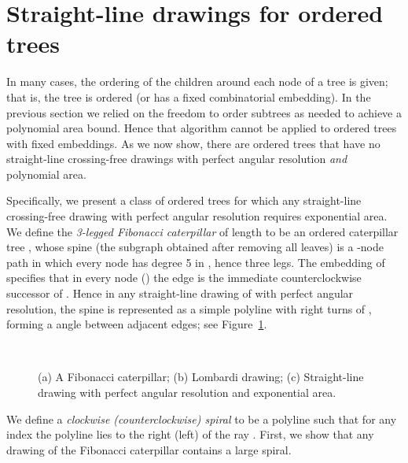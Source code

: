 \documentclass[11pt]{article}
\begin{document}
\section{Straight-line drawings for ordered trees}
\label{sec:exponentialArea}

In many cases, the ordering of the children around each node of a
tree is given; that is, the tree is ordered (or has a fixed
combinatorial embedding).  In the previous section we relied on the
freedom to order subtrees as needed to achieve a polynomial area
bound. Hence that algorithm cannot be applied to ordered trees with
fixed embeddings. As we now show, there are ordered trees that have no
straight-line crossing-free drawings with perfect
angular resolution  \emph{and} polynomial area.

Specifically, we present a class of ordered trees for which any
straight-line crossing-free drawing with perfect angular
resolution requires exponential area. 
We define the \emph{3-legged Fibonacci caterpillar} of length  to be an ordered caterpillar tree , whose spine (the subgraph obtained after removing all leaves) is a -node path  in which every node  has degree 5 in , hence three legs.
The embedding of  specifies that in every node  () the edge  is the immediate counterclockwise successor of .
Hence in any straight-line drawing of  with perfect angular resolution, the spine is represented as a simple polyline with  right turns of , forming a  angle between adjacent edges; see Figure~\ref{fig:fibWoolyWorm}.

\begin{figure}[hbt]
\centering
\begin{minipage}[b]{4cm}
\\
\end{minipage}
\hfil
{}
\caption{(a) A Fibonacci caterpillar; (b) Lombardi drawing; (c) Straight-line drawing with perfect angular resolution and exponential area.}
\label{fig:fibWoolyWorm}
\end{figure}

We define a \emph{clockwise (counterclockwise) spiral} to be a polyline  such that for any index  the polyline  lies to the right (left) of the ray .
First, we show that any drawing of the Fibonacci caterpillar contains a large spiral.
\end{document}
